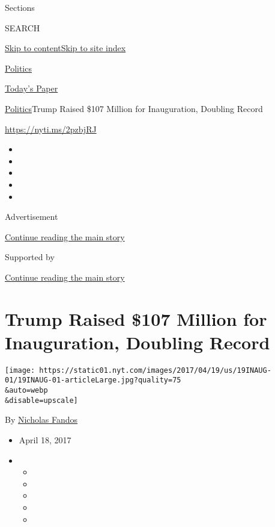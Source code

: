 Sections

SEARCH

\protect\hyperlink{site-content}{Skip to
content}\protect\hyperlink{site-index}{Skip to site index}

\href{https://www.nytimes.com/section/politics}{Politics}

\href{https://myaccount.nytimes.com/auth/login?response_type=cookie\&client_id=vi}{}

\href{https://www.nytimes.com/section/todayspaper}{Today's Paper}

\href{/section/politics}{Politics}\textbar{}Trump Raised \$107 Million
for Inauguration, Doubling Record

\url{https://nyti.ms/2pzbjRJ}

\begin{itemize}
\item
\item
\item
\item
\item
\end{itemize}

Advertisement

\protect\hyperlink{after-top}{Continue reading the main story}

Supported by

\protect\hyperlink{after-sponsor}{Continue reading the main story}

\hypertarget{trump-raised-107-million-for-inauguration-doubling-record}{%
\section{Trump Raised \$107 Million for Inauguration, Doubling
Record}\label{trump-raised-107-million-for-inauguration-doubling-record}}

\texttt{[image: https://static01.nyt.com/images/2017/04/19/us/19INAUG-01/19INAUG-01-articleLarge.jpg?quality=75\\\&auto=webp\\\&disable=upscale]}

By \href{https://www.nytimes.com/by/nicholas-fandos}{Nicholas Fandos}

\begin{itemize}
\item
  April 18, 2017
\item
  \begin{itemize}
  \item
  \item
  \item
  \item
  \item
  \end{itemize}
\end{itemize}

